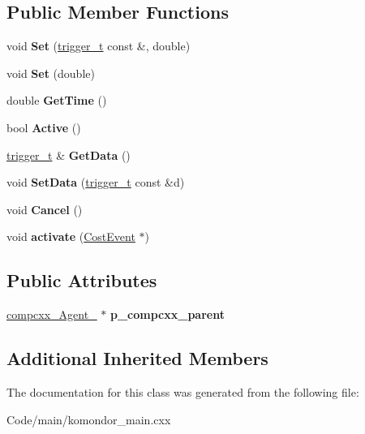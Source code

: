\subsection*{Public Member Functions}
\begin{DoxyCompactItemize}
\item 
\mbox{\label{classcompcxx__Timer__20_ac812a18210553a3499bd781d5754e197}} 
void {\bfseries Set} (\hyperlink{classtrigger__t}{trigger\+\_\+t} const \&, double)
\item 
\mbox{\label{classcompcxx__Timer__20_a41eddcb43938c37e17b45d870f861d5b}} 
void {\bfseries Set} (double)
\item 
\mbox{\label{classcompcxx__Timer__20_ad1a7d45984576a86c3e4d021e543e594}} 
double {\bfseries Get\+Time} ()
\item 
\mbox{\label{classcompcxx__Timer__20_a6ebd529cfacdf50ca9bea8ebf015863c}} 
bool {\bfseries Active} ()
\item 
\mbox{\label{classcompcxx__Timer__20_a4a1167399fe354c9628f01a0c9efcdb3}} 
\hyperlink{classtrigger__t}{trigger\+\_\+t} \& {\bfseries Get\+Data} ()
\item 
\mbox{\label{classcompcxx__Timer__20_aa6803a6a600210a965a4faede94f8468}} 
void {\bfseries Set\+Data} (\hyperlink{classtrigger__t}{trigger\+\_\+t} const \&d)
\item 
\mbox{\label{classcompcxx__Timer__20_a44cb79945992e02ed6ffccb9a7ee6d1e}} 
void {\bfseries Cancel} ()
\item 
\mbox{\label{classcompcxx__Timer__20_a5c57b327c1875223f810cde3ec6c0dca}} 
void {\bfseries activate} (\hyperlink{structCostEvent}{Cost\+Event} $\ast$)
\end{DoxyCompactItemize}
\subsection*{Public Attributes}
\begin{DoxyCompactItemize}
\item 
\mbox{\label{classcompcxx__Timer__20_a5f333d57effaf858109e5bedd658a12c}} 
\hyperlink{classcompcxx__Agent__25}{compcxx\+\_\+\+Agent\+\_} $\ast$ {\bfseries p\+\_\+compcxx\+\_\+parent}
\end{DoxyCompactItemize}
\subsection*{Additional Inherited Members}


The documentation for this class was generated from the following file\+:\begin{DoxyCompactItemize}
\item 
Code/main/komondor\+\_\+main.\+cxx\end{DoxyCompactItemize}
